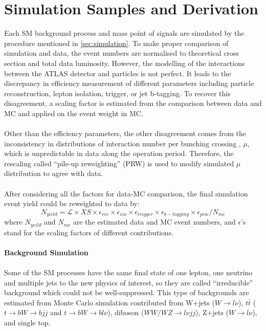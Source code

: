 \section{Simulation Samples and Derivation}
Each SM background process and mass point of signals are simulated by the procedure mentioned in \ref{sec:simulation}.  To make proper comparison of simulation and data, the event numbers are normalised to theoretical cross section and total data luminosity. However, the modelling of the interactions between the ATLAS detector and particles is not perfect. It leads to the discrepancy in efficiency measurement of different parameters including particle reconstruction, lepton isolation, trigger, or jet b-tagging. To recover this disagreement, a scaling factor is estimated from the comparison between data and MC and applied on the event weight in MC. 
\\
\\Other than the efficiency parameters, the other disagreement comes from the inconsistency in distributions of interaction number per bunching crossing , $\mu$, which is unpredictable in data along the operation period. Therefore, the rescaling called ``pile-up reweighting'' (PRW) is used to modify simulated $\mu$ distribution to agree with data. 
\\
\\After considering all the factors for data-MC comparison, the final simulation event yield could be reweighted to data by:
\begin{equation}
N_{yield} = \mathcal{L}\times XS \times \epsilon_{rec} \times \epsilon_{iso} \times \epsilon_{trigger} \times \epsilon_{b-tagging} \times \epsilon_{prw} / N_{mc}
\end{equation}
where $N_{yeild}$ and $N_{mc}$ are the estimated data and MC event numbers, and $\epsilon$'s stand for the scaling factors of different contributions. 
\\
\\{\bf Background Simulation}
\\
\\Some of the SM processes have the same final state of one lepton, one neutrino and multiple jets to the new physics of interest, so they are called ``irreducible'' background which could not be well-suppressed. This type of backgrounds are estimated from Monte Carlo simulation contributed from W+jets ($W\rightarrow l\nu$), $t\bar{t}$ ($t\rightarrow bW \rightarrow bjj$ and $t\rightarrow bW \rightarrow bl\nu$), diboson ($WW/WZ\rightarrow l\nu jj$), Z+jets ($W\rightarrow l\nu$), and single top.  
